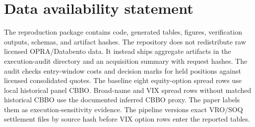 \documentclass[11pt]{article}
\theoremstyle{definition}
\theoremstyle{remark}
\begin{document}
\vspace{0.30cm}





\clearpage
\appendix


\clearpage
\section*{Data availability statement}
The reproduction package contains code, generated tables, figures, verification outputs,
schemas, and artifact hashes. The repository does not redistribute raw licensed
OPRA/Databento data. It instead ships aggregate artifacts in the execution-audit
directory and an acquisition summary with request hashes.
The audit checks entry-window costs and decision marks for held positions against licensed
consolidated quotes. The baseline eight equity-option spread rows use local historical
panel CBBO. Broad-name and VIX spread rows without matched historical CBBO use the
documented inferred CBBO proxy. The paper labels them as execution-sensitivity evidence.
The pipeline versions exact VRO/SOQ settlement files by source hash before VIX option rows
enter the reported tables.



\end{document}
